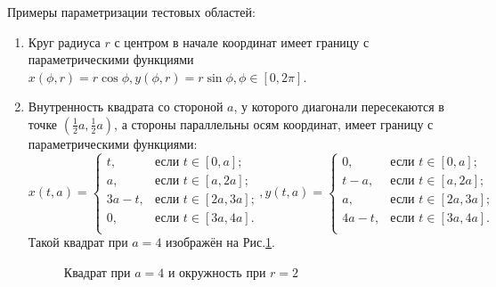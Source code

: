 \documentclass[a4paper]{article}
\begin{document}
Примеры параметризации тестовых областей:
\begin{enumerate}
    \item Круг радиуса $r$ с центром в начале координат имеет границу с параметрическими функциями $x(\phi, r)=r \cos \phi, y(\phi, r)=r \sin \phi, \phi \in [0, 2\pi]$. 
     \item Внутренность квадрата со стороной $a$, у которого диагонали пересекаются в точке $(\frac{1}{2}a,\frac{1}{2}a)$, а стороны параллельны осям координат, имеет границу с параметрическими функциями:
     \[
x(t,a) =
\begin{cases}
t, & \text{если $t \in [0,a]$;} \\
a, & \text{если $t \in [a,2a]$;} \\
3a-t, & \text{если $t \in [2a,3a]$;} \\
0, & \text{если $t \in [3a,4a]$.} \\
\end{cases},
y(t,a) =
\begin{cases}
0, & \text{если $t \in [0,a]$;} \\
t-a, & \text{если $t \in [a,2a]$;} \\
a, & \text{если $t \in [2a,3a]$;} \\
4a-t, & \text{если $t \in [3a,4a]$.} \\
\end{cases}
\]
Такой квадрат при $a=4$ изображён на Рис.\ref{kvci}.
\begin{figure}[h!]
    \noindent{}
    \caption{Квадрат при $a=4$ и окружность при $r=2$}
    \label{kvci}
    \end{figure} 


\end{enumerate}
\end{document}
